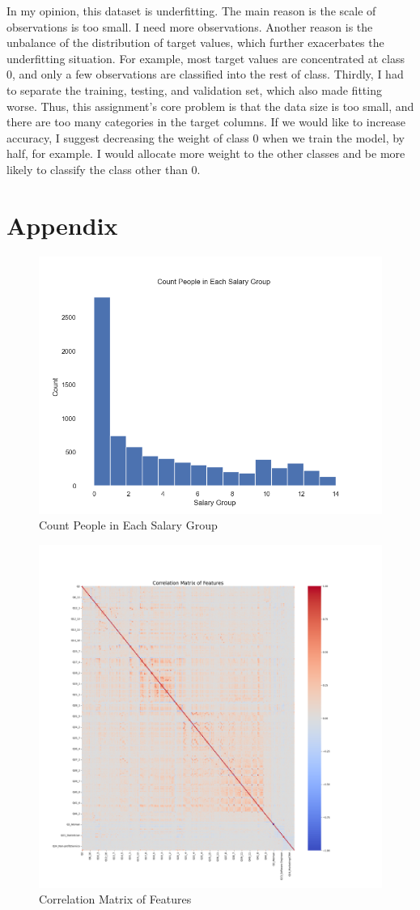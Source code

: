 \documentclass[10pt,onecolumn,letterpaper]{article}
\begin{document}
In my opinion, this dataset is underfitting. The main reason is the scale of observations is too small. I need more observations. Another reason is the unbalance of the distribution of target values, which further exacerbates the underfitting situation. For example, most target values are concentrated at class 0, and only a few observations are classified into the rest of class. Thirdly, I had to separate the training, testing, and validation set, which also made fitting worse. Thus, this assignment's core problem is that the data size is too small, and there are too many categories in the target columns. If we would like to increase accuracy, I suggest decreasing the weight of class 0 when we train the model, by half, for example. I would allocate more weight to the other classes and be more likely to classify the class other than 0.

\section*{Appendix}

\appendix

\begin{figure}[htbp]
  \centering
  \includegraphics[width=.75\textwidth]{f1.png}
  \caption{Count People in Each Salary Group}
\end{figure}

\begin{figure}[htbp]
  \centering
  \includegraphics[width=.75\textwidth]{f2.png}
  \caption{Correlation Matrix of Features}
\end{figure}
\end{document}
